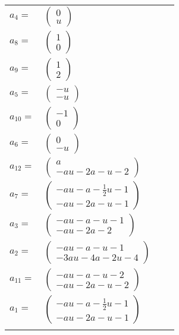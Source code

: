 \documentclass[1p]{elsarticle_modified}
\theoremstyle{definition}
\begin{document}
\begin{tabular}{m{7pt} m{180pt} m{7pt} m{180pt} }
\flushright $a_{4}=$&$\begin{pmatrix}0\\u\end{pmatrix}$ \\
\flushright $a_{8}=$&$\begin{pmatrix}1\\0\end{pmatrix}$ \\
\flushright $a_{9}=$&$\begin{pmatrix}1\\2\end{pmatrix}$ \\
\flushright $a_{5}=$&$\begin{pmatrix}- u\\- u\end{pmatrix}$ \\
\flushright $a_{10}=$&$\begin{pmatrix}-1\\0\end{pmatrix}$ \\
\flushright $a_{6}=$&$\begin{pmatrix}0\\- u\end{pmatrix}$ \\
\flushright $a_{12}=$&$\begin{pmatrix}a\\- a u-2 a- u-2\end{pmatrix}$ \\
\flushright $a_{7}=$&$\begin{pmatrix}- a u- a-\frac{1}{2} u-1\\- a u-2 a- u-1\end{pmatrix}$ \\
\flushright $a_{3}=$&$\begin{pmatrix}- a u- a- u-1\\- a u-2 a-2\end{pmatrix}$ \\
\flushright $a_{2}=$&$\begin{pmatrix}- a u- a- u-1\\-3 a u-4 a-2 u-4\end{pmatrix}$ \\
\flushright $a_{11}=$&$\begin{pmatrix}- a u- a- u-2\\- a u-2 a- u-2\end{pmatrix}$ \\
\flushright $a_{1}=$&$\begin{pmatrix}- a u- a-\frac{1}{2} u-1\\- a u-2 a- u-1\end{pmatrix}$\\&\end{tabular}
\end{document}
